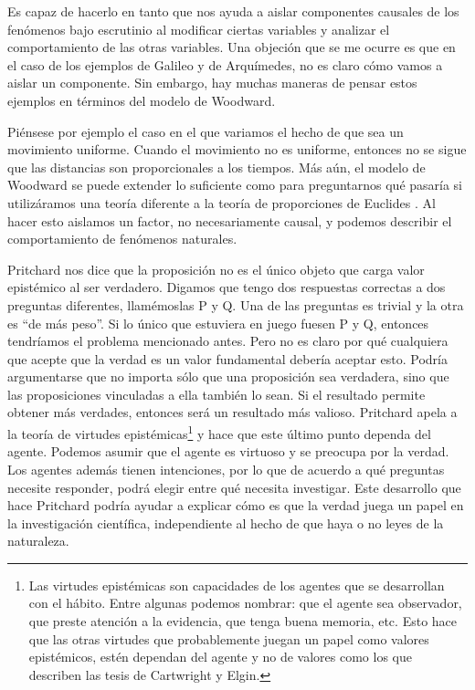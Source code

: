 Es capaz de hacerlo en tanto que nos ayuda a aislar componentes causales de los fenómenos bajo escrutinio al modificar ciertas variables y analizar el comportamiento de las otras variables. Una objeción que se me ocurre es que en el caso de los ejemplos de Galileo y de Arquímedes, no es claro cómo vamos a aislar un componente. Sin embargo, hay muchas maneras de pensar estos ejemplos en términos del modelo de Woodward.

Piénsese por ejemplo el caso en el que variamos el hecho de que sea un movimiento uniforme. Cuando el movimiento no es uniforme, entonces no se sigue que las distancias son proporcionales a los tiempos. Más aún, el modelo de Woodward se puede extender lo suficiente como para preguntarnos qué pasaría si utilizáramos una teoría diferente a la teoría de proporciones de Euclides \cite{Woodward2018}. Al hacer esto aislamos un factor, no necesariamente causal, y podemos describir el comportamiento de fenómenos naturales.

Pritchard nos dice que la proposición no es el único objeto que carga valor epistémico al ser verdadero. Digamos que tengo dos respuestas correctas a dos preguntas diferentes, llamémoslas P y Q. Una de las preguntas es trivial y la otra es ``de más peso''. Si lo único que estuviera en juego fuesen P y Q, entonces tendríamos el problema mencionado antes. Pero no es claro por qué cualquiera que acepte que la verdad es un valor fundamental debería aceptar esto. Podría argumentarse que no importa sólo que una proposición sea verdadera, sino que las proposiciones vinculadas a ella también lo sean. Si el resultado permite obtener más verdades, entonces será un resultado más valioso. Pritchard apela a la teoría de virtudes epistémicas\footnote{Las virtudes epistémicas son capacidades de los agentes que se desarrollan con el hábito. Entre algunas podemos nombrar: que el agente sea observador, que preste atención a la evidencia, que tenga buena memoria, etc. Esto hace que las otras virtudes que probablemente juegan un papel como valores epistémicos, estén dependan del agente y no de valores como los que describen las tesis de Cartwright y Elgin.} y hace que este último punto dependa del agente. Podemos asumir que el agente es virtuoso y se preocupa por la verdad. Los agentes además tienen intenciones, por lo que de acuerdo a qué preguntas necesite responder, podrá elegir entre qué necesita investigar. Este desarrollo que hace Pritchard podría ayudar a explicar cómo es que la verdad juega un papel en la investigación científica, independiente al hecho de que haya o no leyes de la naturaleza.

